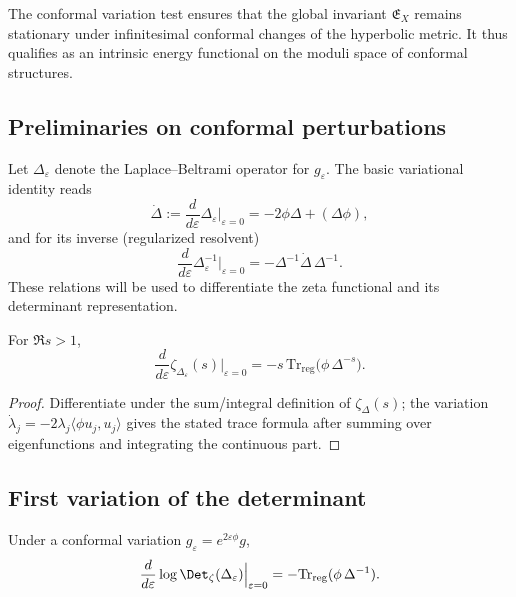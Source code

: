 \begin{invariant}
\label{inv:C13-pre}
The conformal variation test ensures that the global invariant $\mathfrak{E}_X$ remains stationary under infinitesimal conformal changes of the hyperbolic metric.  
It thus qualifies as an intrinsic energy functional on the moduli space of conformal structures. \relax
\end{invariant}


\subsection{Preliminaries on conformal perturbations}
\label{subsec:ch4-part7-prelim} \relax

Let $\Delta_\varepsilon$ denote the Laplace–Beltrami operator for $g_\varepsilon$.  
The basic variational identity reads
\[
\dot\Delta := \frac{d}{d\varepsilon}\Delta_\varepsilon\Big|_{\varepsilon=0}
= -2\phi\Delta + (\Delta\phi),
\]
and for its inverse (regularized resolvent)
\[
\frac{d}{d\varepsilon}\Delta_\varepsilon^{-1}\Big|_{\varepsilon=0}
= -\Delta^{-1}\dot\Delta\,\Delta^{-1}.
\]
These relations will be used to differentiate the zeta functional and its determinant representation.

\begin{lemma}
\label{lem:zeta-variation}
For $\Re s>1$,
\[
\frac{d}{d\varepsilon}\zeta_{\Delta_\varepsilon}(s)\Big|_{\varepsilon=0}
= -s\,\mathrm{Tr}_{\mathrm{reg}}\big(\phi\,\Delta^{-s}\big).
\]
\end{lemma}

\begin{proof}\relax
Differentiate under the sum/integral definition of $\zeta_\Delta(s)$;  
the variation $\dot\lambda_j = -2\lambda_j\langle \phi u_j,u_j\rangle$ gives the stated trace formula after summing over eigenfunctions and integrating the continuous part. \relax
\end{proof}

\subsection{First variation of the determinant}
\label{subsec:ch4-part7-firstvar} \relax

\begin{theorem}
\label{thm:first-variation}
Under a conformal variation $g_\varepsilon=e^{2\varepsilon\phi}g$,
\[
\frac{d}{d\varepsilon}\log\Det_\zeta(\Delta_\varepsilon)\Big|_{\varepsilon=0}
= -\mathrm{Tr}_{\mathrm{reg}}(\phi\,\Delta^{-1}).
\]
\end{theorem}

